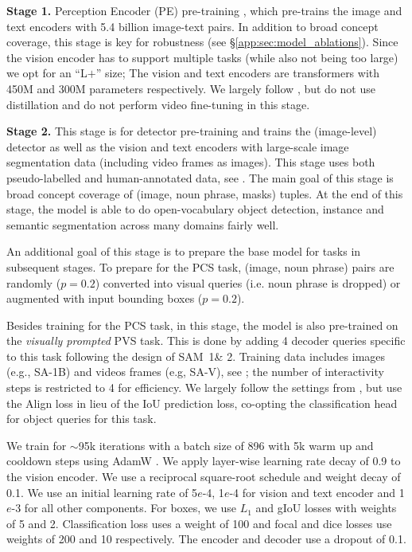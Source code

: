 \documentclass[]{fairmeta}
\newcommand{\eg}{e.g., }
\newcommand{\samone}{SAM~1\xspace}
\newcommand{\pvstask}{PVS\xspace}
\newcommand{\task}{PCS\xspace}
\renewcommand{\paragraph}[1]{%
	\noindent\textbf{#1.}\noindent\xspace%
}
\begin{document}
\paragraph{Stage 1} Perception Encoder (PE) pre-training \citep{bolya2025PerceptionEncoder}, which pre-trains the image and text encoders with 5.4 billion image-text pairs. In addition to broad concept coverage, this stage is key for robustness (see \S\ref{app:sec:model_ablations}). Since the vision encoder has to support multiple tasks (while also not being too large) we opt for an ``L$+$'' size; The vision and text encoders are transformers with 450M and 300M parameters respectively. We largely follow \cite{bolya2025PerceptionEncoder}, but do not use distillation and do not perform video fine-tuning in this stage.

\paragraph{Stage 2} This stage is for detector pre-training and trains the (image-level) detector as well as the vision and text encoders with large-scale image segmentation data (including video frames as images). This stage uses both pseudo-labelled and human-annotated data, see . The main goal of this stage is broad concept coverage of (image, noun phrase, masks) tuples. At the end of this stage, the model is able to do open-vocabulary object detection, instance and semantic segmentation across many domains fairly well.

An additional goal of this stage is to prepare the base model for tasks in subsequent stages. To prepare for the \task task, (image, noun phrase) pairs are randomly ($p=0.2$) converted into visual queries (i.e. noun phrase is dropped) or augmented with input bounding boxes ($p=0.2$).

Besides training for the \task task, in this stage, the model is also pre-trained on the \textit{visually prompted} \pvstask task. This is done by adding 4 decoder queries specific to this task following the design of \samone \& 2. Training data includes images (\eg SA-1B)  and videos frames (e.g, SA-V), see ; the number of interactivity steps is restricted to 4 for efficiency. We largely follow the settings from \cite{sam2}, but use the Align loss \citep{aligndetr} in lieu of the IoU prediction loss, co-opting the classification head for object queries for this task.

We train for $\sim$95k iterations with a batch size of 896 with 5k warm up and cooldown steps using AdamW \citep{adamw}. We apply layer-wise learning rate decay \citep{electra} of 0.9 to the vision encoder. We use a reciprocal square-root schedule \citep{zhai2022scalingvisiontransformers} and weight decay of 0.1. We use an initial learning rate of 5$e$-4, 1$e$-4 for vision and text encoder and 1$e$-3 for all other components. For boxes, we use $L_1$ and gIoU losses with weights of 5 and 2. Classification loss uses a weight of 100 and focal and dice losses use weights of 200 and 10 respectively. The encoder and decoder use a dropout of 0.1.
\end{document}

